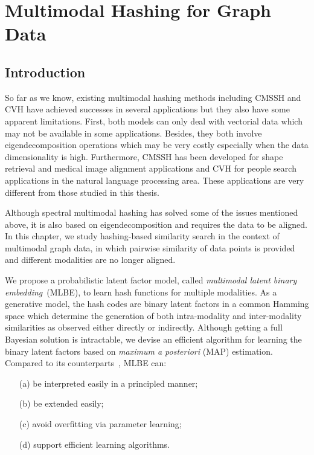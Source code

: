
\chapter{Multimodal Hashing for Graph Data}
\label{chap:mlbe}

\section{Introduction}

So far as we know, existing multimodal hashing methods including CMSSH and CVH have achieved successes in several applications but they also have some apparent limitations.  First, both models can only deal with vectorial data which may not be available in some applications.  Besides, they both involve eigendecomposition operations which may be very costly especially when the data dimensionality is high.  Furthermore, \mbox{CMSSH} has been developed for shape retrieval and medical image alignment applications and \mbox{CVH} for people search applications in the natural language processing area. These applications are very different from those studied in this thesis.

Although spectral multimodal hashing has solved some of the issues mentioned above, it is also based on eigendecomposition and requires the data to be aligned. In this chapter, we study hashing-based similarity search in the context of multimodal graph data, in which pairwise similarity of data points is provided and different modalities are no longer aligned.

We propose a probabilistic latent factor model, called \textit{multimodal latent binary embedding}~(\mbox{MLBE}),
to learn hash functions for multiple modalities.  As a generative model, the hash codes are binary latent factors in a common Hamming space which determine the generation of both intra-modality and inter-modality similarities as observed either directly or indirectly.  Although getting a full Bayesian solution is intractable, we devise an efficient algorithm for learning the binary latent factors based on \textit{maximum a posteriori} (\mbox{MAP}) estimation. Compared to its counterparts~\cite{bronstein2010cvpr,kumar2011ijcai}, MLBE can:
\begin{itemize}
\item[(a)] be interpreted easily in a principled manner;
\item[(b)] be extended easily;
\item[(c)] avoid overfitting via parameter learning;
\item[(d)] support efficient learning algorithms.
\end{itemize}

